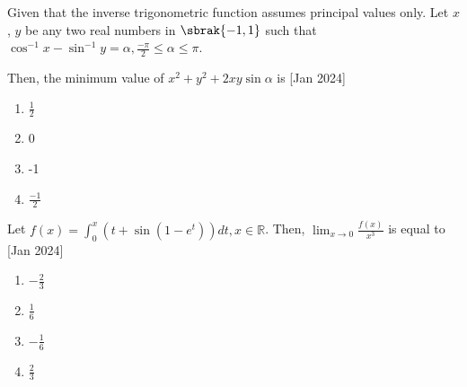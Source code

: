     \item{
			
			Given that the inverse trigonometric function assumes principal values only. Let $x$, $y$ be any two real numbers in $\sbrak{-1,1}$ such that $\cos ^{-1} x-\sin ^{-1} y=\alpha, \frac{-\pi}{2} \leq \alpha \leq \pi$.
			
			Then, the minimum value of $x^{2}+y^{2}+2 x y \sin \alpha$ is
			\text{   }\hfill
			{[Jan 2024]}
			\begin{multicols}{4}
				\begin{enumerate}
						\item $\frac{1}{2}$
						\item 0
						\item -1
						\item $\frac{-1}{2}$
				\end{enumerate}
			\end{multicols}
			
		}

    \item{
        
           
           	Let $f(x)=\int_{0}^{x}\left(t+\sin \left(1-e^{t}\right)\right) d t, x \in \mathbb{R}$. Then, $\lim _{x \rightarrow 0} \frac{f(x)}{x^{3}}$ is equal to\\ \text{ }
             \hfill
              {[Jan 2024]}
			\begin{multicols}{2}              
	              		\begin{enumerate}
	              			\item $-\frac{2}{3}$
	              			\item $\frac{1}{6}$
	              			\item $-\frac{1}{6}$
	              			\item $\frac{2}{3}$
	              	\end{enumerate}
  			\end{multicols}      
        }



